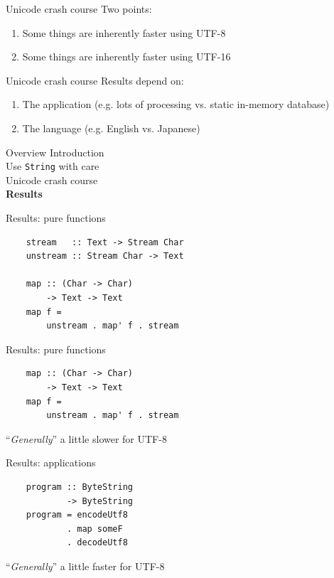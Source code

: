 \documentclass[20pt]{beamer}
\newcommand{\vspaced}{
    \vspace{5mm}
}
\begin{document}
\begin{frame}{Unicode crash course}
    Two points:
    \begin{enumerate}
    \item Some things are inherently faster using UTF-8
    \item Some things are inherently faster using UTF-16
    \end{enumerate}
\end{frame}

\begin{frame}{Unicode crash course}
    Results depend on:
    \begin{enumerate}
    \vspaced
    \item The application (e.g. lots of processing vs. static in-memory
    database)
    \vspaced
    \item The language (e.g. English vs. Japanese)
    \end{enumerate}
\end{frame}


\begin{frame}{Overview}
    Introduction \\
    Use \texttt{String} with care \\
    Unicode crash course \\
    \textbf{Results} \\
\end{frame}

\begin{frame}[fragile]{Results: pure functions}
    \begin{lstlisting}
    stream   :: Text -> Stream Char
    unstream :: Stream Char -> Text

    map :: (Char -> Char)
        -> Text -> Text
    map f =
        unstream . map' f . stream
    \end{lstlisting}
\end{frame}

\begin{frame}[fragile]{Results: pure functions}
    \begin{lstlisting}
    map :: (Char -> Char)
        -> Text -> Text
    map f =
        unstream . map' f . stream
    \end{lstlisting}
    \vspaced
    ``\textit{Generally}'' a little slower for UTF-8
\end{frame}

\begin{frame}[fragile]{Results: applications}
    \begin{lstlisting}
    program :: ByteString
            -> ByteString
    program = encodeUtf8
            . map someF
            . decodeUtf8
    \end{lstlisting}
    \vspaced
    ``\textit{Generally}'' a little faster for UTF-8
\end{frame}
\end{document}
